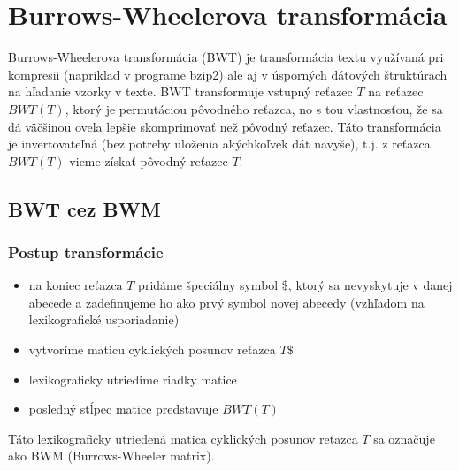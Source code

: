 
\section{Burrows-Wheelerova transformácia}
    Burrows-Wheelerova transformácia (BWT) je transformácia textu využívaná pri
    kompresii (napríklad v programe bzip2) ale aj v úsporných dátových
    štruktúrach na hľadanie vzorky v texte. BWT transformuje vstupný reťazec $T$
    na reťazec $BWT(T)$, ktorý je permutáciou pôvodného reťazca, no s tou
    vlastnosťou, že sa dá väčšinou oveľa lepšie skomprimovať než pôvodný
    reťazec. Táto transformácia je invertovateľná (bez potreby uloženia
    akýchkoľvek dát navyše), t.j. z reťazca $BWT(T)$ vieme získať pôvodný reťazec
    $T$.
    
    \subsection{BWT cez BWM}
    \subsubsection*{Postup transformácie}
    \begin{itemize}
        \item na koniec reťazca $T$ pridáme špeciálny symbol \$, ktorý sa
        nevyskytuje v danej abecede a zadefinujeme ho ako prvý symbol novej
        abecedy (vzhľadom na lexikografické usporiadanie)
        \item vytvoríme maticu cyklických posunov reťazca $T\$$
        \item lexikograficky utriedime riadky matice
        \item posledný stĺpec matice predstavuje $BWT(T)$
    \end{itemize}
    
    Táto lexikograficky utriedená matica cyklických posunov reťazca $T$
    sa označuje ako BWM (Burrows-Wheeler matrix).
    
